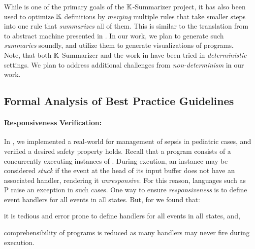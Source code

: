While \SBC{} is one of the primary goals of the $\mathbb{K}{}$-Summarizer
project, it has also been used to optimize $\mathbb{K}$ definitions
by \emph{merging} multiple rules that take smaller steps into
one rule that \emph{summarizes} all of them. This is similar
to the translation from \SOS{} to abstract machine presented in
\cite{KoppelICFP22}. In our work, we plan to generate such
\emph{summaries} soundly, and utilize them to generate visualizations
of \MediK{} programs. Note, that both $\mathbb{K}$ Summarizer and the work
in \cite{KoppelICFP22} have been tried in \emph{deterministic} settings.
We plan to address additional challenges from \emph{non-determinism} in our
work.

\subsection{Formal Analysis of Best Practice Guidelines}\label{subsec:formal-analysis}

\paragraph{Responsiveness Verification:}

In \cite{SaxenaFMCAD23}, we implemented a real-world \CDSS{} for management of
sepsis in pediatric cases, and verified a desired safety property holds.
Recall that a \MediK{} program consists of a concurrently executing instances
of \FSMs{}. During excution, an instance may be considered \emph{stuck} if
the event at the head of its input buffer does not have an associated handler,
rendering it \emph{unresponsive}. For this reason, languages such as P
\cite{DesaiPLDI13} raise an exception in such cases. One way to ensure
\emph{responsiveness} is to define event handlers for all events
in all states. But, for \MediK{} we found that:
\begin{enumerate*}[label=(\alph*)]
  \item it is tedious and error prone to define handlers for all events in all
  states, and,
  \item comprehensibility of programs is reduced as many handlers may never fire
  during execution.
\end{enumerate*}

